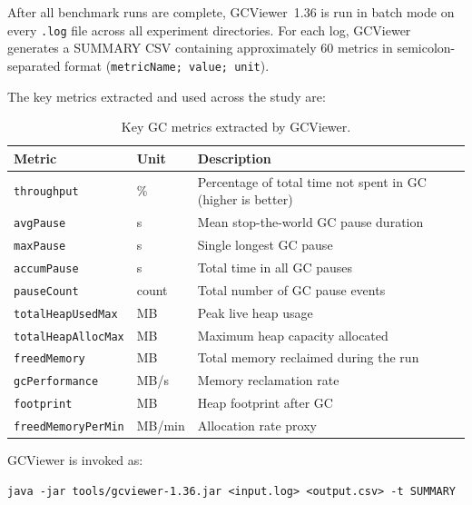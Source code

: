 After all benchmark runs are complete, GCViewer~1.36 is run in batch mode on every \texttt{.log} file across all experiment directories. For each log, GCViewer generates a SUMMARY CSV containing approximately 60 metrics in semicolon-separated format (\texttt{metricName; value; unit}).

The key metrics extracted and used across the study are:

\begin{table}[h]
\centering
\caption{Key GC metrics extracted by GCViewer.}
\label{tab:gc-metrics}
\begin{tabular}{llp{7cm}}
\hline
\textbf{Metric} & \textbf{Unit} & \textbf{Description} \\
\hline
\texttt{throughput}        & \%     & Percentage of total time not spent in GC (higher is better) \\
\texttt{avgPause}          & s      & Mean stop-the-world GC pause duration \\
\texttt{maxPause}          & s      & Single longest GC pause \\
\texttt{accumPause}        & s      & Total time in all GC pauses \\
\texttt{pauseCount}        & count  & Total number of GC pause events \\
\texttt{totalHeapUsedMax}  & MB     & Peak live heap usage \\
\texttt{totalHeapAllocMax} & MB     & Maximum heap capacity allocated \\
\texttt{freedMemory}       & MB     & Total memory reclaimed during the run \\
\texttt{gcPerformance}     & MB/s   & Memory reclamation rate \\
\texttt{footprint}         & MB     & Heap footprint after GC \\
\texttt{freedMemoryPerMin} & MB/min & Allocation rate proxy \\
\hline
\end{tabular}
\end{table}

GCViewer is invoked as:

\begin{verbatim}
java -jar tools/gcviewer-1.36.jar <input.log> <output.csv> -t SUMMARY
\end{verbatim}

